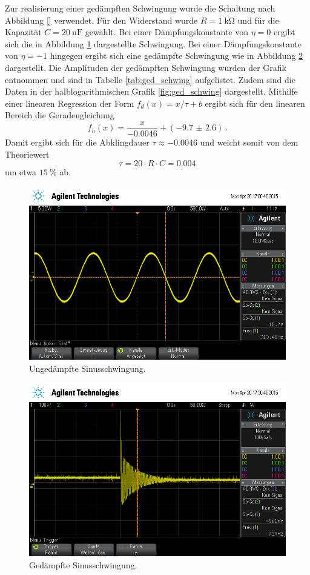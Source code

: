 Zur realisierung einer gedämpften Schwingung wurde die Schaltung nach Abbildung \ref{} verwendet.
Für den Widerstand wurde $R = \SI{1}{\kilo\ohm}$ und für die Kapazität $C = \SI{20}{\nano\farad}$ gewählt.
Bei einer Dämpfungskonstante von $\eta = 0$ ergibt sich die in Abbildung \ref{fig:unged_sinus} dargestellte Schwingung.
Bei einer Dämpfungskonstante von $\eta = -1$ hingegen ergibt sich eine gedämpfte Schwingung wie in Abbildung \ref{fig:ged_sinus} dargestellt.
Die Amplituden der gedämpften Schwingung wurden der Grafik entnommen und sind in Tabelle \ref{tab:ged_schwing} aufgelistet.
Zudem sind die Daten in der halblogarithmischen Grafik \ref{fig:ged_schwing} dargestellt.
Mithilfe einer linearen Regression der Form $f_{d}(x) = x / \tau + b$ ergibt sich für den linearen Bereich die Geradengleichung
\begin{equation*}
    f_h(x) = \frac{x}{\num{-0.0046}} + (\num{-9.7(26)})\,.
\end{equation*}
Damit ergibt sich für die Abklingdauer $\tau \approx \num{-0.0046}$ und weicht somit von dem Theoriewert
\begin{equation*}
    \tau = 20 \cdot R \cdot C = 0.004
\end{equation*}
um etwa $\SI{15}{\percent}$ ab.

\begin{figure}[!h]
    \centering
    \includegraphics[width=0.8\linewidth]{data/scope_16.png}
    \caption{Ungedämpfte Sinusschwingung.}
    \label{fig:unged_sinus}
\end{figure}

\begin{figure}[!h]
    \centering
    \includegraphics[width=0.8\linewidth]{data/scope_18.png}
    \caption{Gedämpfte Sinusschwingung.}
    \label{fig:ged_sinus}
\end{figure}

